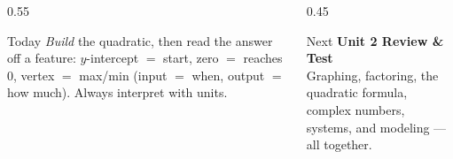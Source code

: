 \documentclass[aspectratio=169, 11pt]{beamer}
\begin{document}
\begin{frame}[t, plain]
  \begin{columns}[T]
    \begin{column}{0.55\textwidth}
      \begin{block}{Today}
        \emph{Build} the quadratic, then read the answer off a feature: $y$-intercept $=$ start, zero $=$ reaches
        $0$, vertex $=$ max/min (input $=$ when, output $=$ how much). Always interpret with units.
      \end{block}
    \end{column}
    \begin{column}{0.45\textwidth}
      \begin{block}{Next}
        \textbf{Unit 2 Review \& Test}
        \\[2pt]
        Graphing, factoring, the quadratic formula, complex numbers, systems, and modeling --- all together.
      \end{block}
    \end{column}
  \end{columns}
\end{frame}
\end{document}
